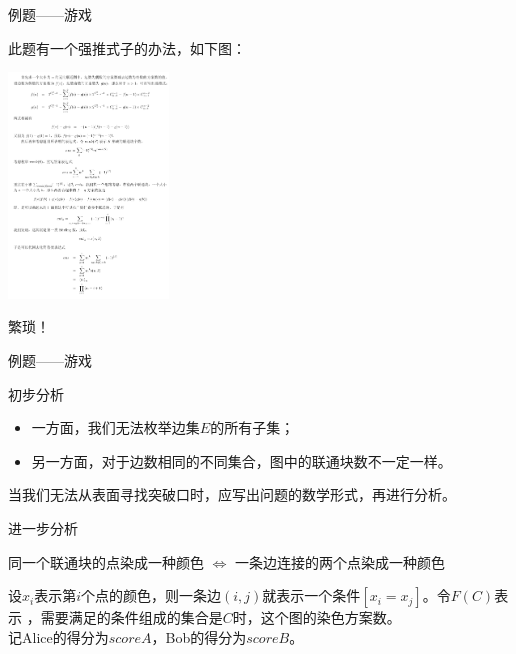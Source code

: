 \documentclass[allowframebreaks,9pt]{beamer}
\begin{document}
\begin{frame}{例题——游戏}

此题有一个强推式子的办法，如下图： \par
\begin{center}
\includegraphics[height=170pt]{math.png}
\end{center}
\par
繁琐！

\end{frame}

\begin{frame}{例题——游戏}

\begin{block}{初步分析}
\begin{itemize}
\item 一方面，我们无法枚举边集$E$的所有子集；
\item 另一方面，对于边数相同的不同集合，图中的联通块数不一定一样。
\end{itemize}
当我们无法从表面寻找突破口时，应写出问题的数学形式，再进行分析。
\end{block}

\pause

\begin{block}{进一步分析}
\begin{center}
{\color{red}同一个联通块的点染成一种颜色} $\iff$ {\color{red}一条边连接的两个点染成一种颜色}
\end{center}
设$x_i$表示第$i$个点的颜色，则一条边$(i,j)$就表示一个条件$[x_i=x_j]$。令$F(C)$表示
，需要满足的条件组成的集合是$C$时，这个图的染色方案数。 \\
记Alice的得分为$scoreA$，Bob的得分为$scoreB$。
\end{block}

\end{frame}
\end{document}
